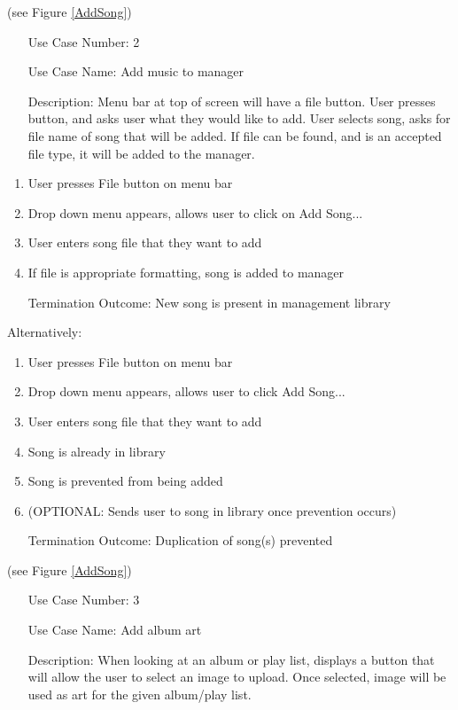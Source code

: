 \documentclass[10pt,conference,onecolumn,compsoc]{IEEEtran}
\begin{document}
(see Figure \ref{AddSong})

\begin{itemize}
\item[Use Case Number:] 2
\item[Use Case Name:] Add music to manager
\item[Description:] Menu bar at top of screen will have a file button. User presses button, and asks user what they would like to add. User selects song, asks for file name of song that will be added. If file can be found, and is an accepted file type, it will be added to the manager.
\end{itemize}

\begin{enumerate}
\item User presses File button on menu bar
\item Drop down menu appears, allows user to click on Add Song...
\item User enters song file that they want to add
\item If file is appropriate formatting, song is added to manager
\item [Termination Outcome:] New song is present in management library
\end{enumerate}

Alternatively:
\begin{enumerate}
\item User presses File button on menu bar
\item Drop down menu appears, allows user to click Add Song...
\item User enters song file that they want to add
\item Song is already in library
\item Song is prevented from being added
\item (OPTIONAL: Sends user to song in library once prevention occurs)
\item [Termination Outcome:] Duplication of song(s) prevented
\end{enumerate}

(see Figure \ref{AddSong})

\begin{itemize}
\item[Use Case Number:] 3
\item[Use Case Name:] Add album art
\item[Description:] When looking at an album or play list, displays a button that will allow the user to select an image to upload. Once selected, image will be used as art for the given album/play list.
\end{itemize}
\end{document}
